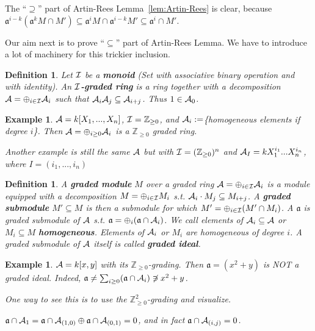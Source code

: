 \documentclass[11pt]{article}
\newtheorem{dfn}[thm]{Definition}
\newtheorem{ex}[thm]{Example}
\newcommand{\intg}{\mathbb Z}
\newcommand{\sca}{{\mathfrak a}}
\newcommand{\cala}{{\cal A}}
\newcommand{\cali}{{\cal I}}
\begin{document}
The ``$\supseteq$'' part of Artin-Rees Lemma~\ref{lem:Artin-Rees} is clear, because $\sca^{i-k}(\sca^k M\cap M')\subseteq \sca^i M\cap\sca^{i-k}M'\subseteq\sca^i\cap M'$.

Our aim next is to prove ``$\subseteq $'' part of Artin-Rees Lemma. We have to introduce a lot of machinery for this trickier inclusion.
\begin{dfn}
Let $\cali$ be a \textbf{monoid} (Set with associative binary operation and with identity). An \textbf{$\cali$-graded ring} is a ring together with a decomposition $\cala=\oplus_{i\in \cali}\cala_i$ such that $\cala_i\cala_j\subseteq \cala_{i+j}$. Thus $1\in \cala_0$.
\end{dfn}

\begin{ex}
$\cala=k[X_1,...,X_n]$, $\cali=\intg_{\geq 0}$, and $\cala_i:=$\{homogeneous elements if degree $i$\}. Then $\cala=\oplus_{i\geq 0}\cala_i$ is a $\intg_{\geq 0}$ graded ring.

Another example is still the same $\cala$ but with $\cali=(\intg_{\geq 0})^n$ and $\cala_I=k X_1^{i_1}...X_n^{i_n}$, where $I=(i_1,...,i_n)$
\end{ex}

\begin{dfn}
A \textbf{graded module} $M$ over a graded ring $\cala=\oplus_{i\in \cali}\cala_i$ is a module equipped with a decomposition $M=\oplus_{i\in \cali } M_i$
 s.t. $\cala_i\cdot M_j\subseteq M_{i+j}$. A \textbf{graded submodule } $M'\subseteq M$ is then a submodule for which $M'=\oplus_{i\in \cali}(M'\cap M_i)$. A  $\sca$ is  graded submodule of $\cala$ s.t. $\sca=\oplus_i(\sca\cap \cala_i)$.
We call elements of $\cala_i\subseteq \cala$ or $ M_i\subseteq M$ \textbf{homogeneous}. Elements of $\cala_i$ or $M_i$ are homogeneous of degree $i$. A graded submodule of $\cala$ itself is called \textbf{graded ideal}.
\end{dfn}

\begin{ex}
$\cala=k[x,y]$ with its $\intg_{\geq 0}$-grading. Then $\sca=(x^2+y)$ is NOT a graded ideal. Indeed, $\sca\neq \sum_{i\geq 0}(\sca\cap \cala_i)\not\ni x^2+y$.

One way to see this is to use the $\intg^2_{\geq 0}$-grading and visualize. 

$\sca\cap\cala_1=\sca\cap\cala_{(1,0)}\oplus\sca\cap\cala_{(0,1)}=0$, and in fact $\sca\cap \cala_{(i,j)}=0$.
\end{ex}
\end{document}
